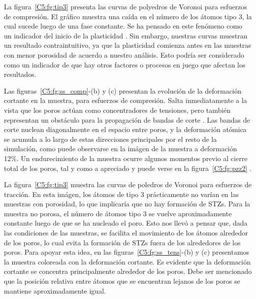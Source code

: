 La figura~\ref{C5:fg:tip3}  presenta las curvas de polyedros de Voronoi para esfuerzos de compresión. El gráfico muestra una caída en el número
de los átomos tipo 3, la cual sucede luego de una fase constante. Se ha pensado en este fenómeno como un indicador del inicio de la plasticidad
\citep{arman10}. Sin embargo, nuestras curvas muestran un resultado contraintuitivo, ya que la plasticidad comienza antes en las muestras con menor
porosidad de acuerdo a nuestro análisis. Esto podría ser considerado como un indicador de que hay otros factores o procesos en juego que afectan
los resultados.

Las figuras~\ref{C5:fg:ss_comp}-(b) y (c) presentan la evolución de la deformación cortante en la muestra, para esfuerzos de compresión.
Salta inmediatamente a la vista que los poros actúan como concentradores de tensiones, pero también representan un obstáculo para la
propagación de bandas de corte \citep{wang10}. Las bandas de corte nuclean diagonalmente en el espacio entre poros, y la deformación atómica
se acumula a lo largo de estas direcciones principales por el resto de la simulación, como puede observarse en la imágen de la muestra a 
deformación 12\%. Un endurecimiento de la muestra ocurre algunos momentos previo al cierre total de los poros, tal y como a apreciado
\cite{yuan14} y puede verse en la figura~\ref{C5:fg:pzz2} .

La figura~\ref{C5:fg:tip3}  muestra las curvas de poledros de Voronoi para esfuerzos de tracción. En esta imágen, los átomos de tipo 3
prácticamente no varían en las muestras con porosidad, lo que implicaría que no hay formación de STZs.
Para la muestra no porosa, el número de átomos tipo 3 se vuelve aproximadamente constante luego de que se ha nucleado el poro. Esto
nos llevó a pensar que, dada las condiciones de las muestras, se facilita el movimiento de los átomos alrededor de los poros, lo cual evita
la formación de STZs fuera de los alrededores de los poros. Para apoyar esta idea, en las figuras~\ref{C5:fg:ss_tens}-(b) y (c) presentamos
la muestra coloreada con la deformación cortante. Es evidente que la deformación cortante se concentra principalmente alrededor
de los poros. Debe ser mencionado que la posición relativa entre átomos que se encuentran lejanos de los poros se mantiene aproximadamente igual.



